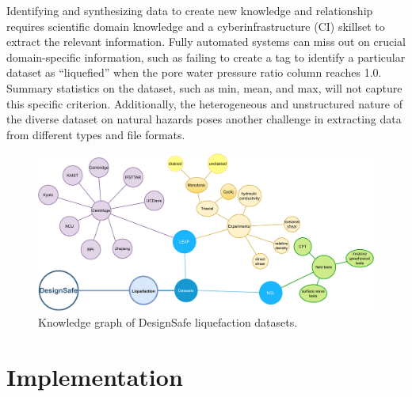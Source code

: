 \documentclass[acmsmall]{acmart}
\begin{document}
Identifying and synthesizing data to create new knowledge and relationship requires scientific domain knowledge and a cyberinfrastructure (CI) skillset to extract the relevant information.
Fully automated systems can miss out on crucial domain-specific information, such as failing to create a tag to identify a particular dataset as ``liquefied'' when the pore water pressure ratio column reaches 1.0. 
Summary statistics on the dataset, such as min, mean, and max, will not capture this specific criterion. 
Additionally, the heterogeneous and unstructured nature of the diverse dataset on natural hazards poses another challenge in extracting data from different types and file formats.






\begin{figure}[t]
\centering
\includegraphics[scale=0.25]{figures/pearc-kg.pdf}
\caption{\label{fig:knowledge-graph}Knowledge graph of DesignSafe liquefaction datasets.}
\end{figure}

\section{Implementation}
\label{sec:org8576338}
\end{document}
